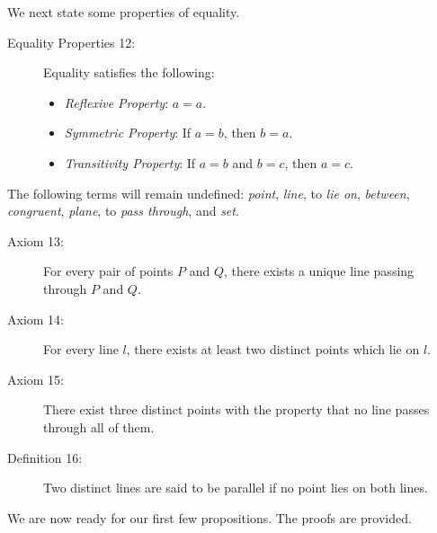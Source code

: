 \documentclass{article}
\begin{document}
We next state some properties of equality.

\begin{description}

\item[Equality Properties 12:] Equality satisfies the following:
\begin{itemize}
  \item \emph{Reflexive Property}: $a=a$.
  \item \emph{Symmetric Property}: If $a=b$, then $b=a.$
  \item \emph{Transitivity Property}: If $a=b$ and $b=c$, then $a=c$.
\end{itemize}

\end{description}

The following terms will remain undefined: \emph{point}, \emph{line}, to \emph{lie on}, \emph{between}, \emph{congruent}, \emph{plane}, to \emph{pass through}, and \emph{set}.

\begin{description}

\item[Axiom 13:] For every pair of points $P$ and $Q$, there exists a unique line passing through $P$ and $Q$.

\item[Axiom 14:] For every line $l$, there exists at least two distinct points which lie on $l$.

\item[Axiom 15:] There exist three distinct points with the property that no line passes through all of them.

\item[Definition 16:] Two distinct lines are said to be parallel if no point lies on both lines.

\end{description}

We are now ready for our first few propositions. The proofs are provided.
\end{document}
